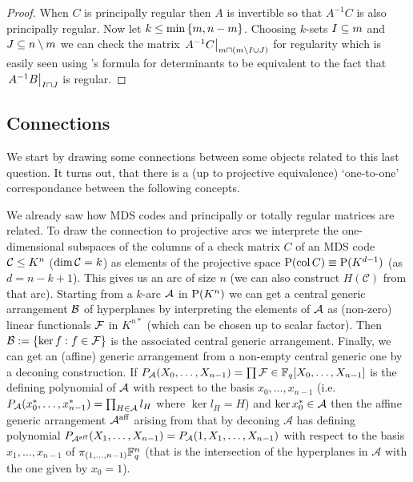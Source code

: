 \begin{proof}
    When $C$ is principally regular then $A$ is invertible so that $A^{-1}C$ is also principally regular. Now let $k\leq \min\left\{m,n-m\right\}$. Choosing $k$-sets $I\subseteq m$ and $J\subseteq n\setminus m$ we can check the matrix $\rest{A^{-1}C}_{m\settimes (m\setminus I\setjoin J)}$ for regularity which is easily seen using 's formula for determinants to be equivalent to the fact that $\rest{A^{-1}B}_{I\settimes J}$ is regular.
\end{proof}

\subsection{Connections}

We start by drawing some connections between some objects related to this last question.
It turns out, that there is a (up to projective equivalence) `one-to-one' correspondance between the following concepts.

We already saw how MDS codes and principally or totally regular matrices are related.
To draw the connection to projective arcs we interprete the one-dimensional subspaces of the columns of a check matrix $C$ of an MDS code $\mathcal{C}\leq K^n$ ($\dim\mathcal{C}=k$) as elements of the projective space $\proj(\col C)\iso \P(K^{d-1})$ (as $d=n-k+1$). This gives us an arc of size $n$ (we can also construct $H(\mathcal{C})$ from that arc).
Starting from a $k$-arc $\mathcal{A}$ in $\P(K^n)$ we can get a central generic arrangement $\mathcal{B}$ of hyperplanes by interpreting the elements of $\mathcal{A}$ as (non-zero) linear functionals $\mathcal{F}$ in $K^{n\ast}$ (which can be chosen up to scalar factor). Then $\mathcal{B}:=\left\{\ker f:f\in \mathcal{F}\right\}$ is the associated central generic arrangement.
Finally, we can get an (affine) generic arrangement from a non-empty central generic one by a deconing construction. If $P_{\mathcal{A}}(X_0,\ldots,X_{n-1})=\prod{\mathcal{F}}\in\mathbb{F}_{q}[X_0,\ldots,X_{n-1}]$ is the defining polynomial of $\mathcal{A}$ with respect to the basis $x_0,\ldots,x_{n-1}$ (i.e. $P_{\mathcal{A}}(x^{\ast}_0,\ldots,x^{\ast}_{n-1})=\prod_{H\in\mathcal{A}}{l_H}$ where $\ker l_H =H$) and $\ker x^{\ast}_0\in\mathcal{A}$ then the affine generic arrangement $\mathcal{A}^{\mathop\mathrm{aff}}$ arising from that by deconing $\mathcal{A}$ has defining polynomial $P_{\mathcal{A}^{\mathop\mathrm{aff}}}(X_1,\ldots,X_{n-1})=P_{\mathcal{A}}(1,X_1,\ldots,X_{n-1})$ with respect to the basis $x_1,\ldots,x_{n-1}$ of $\pi_{(1,\ldots,n-1)}\mathbb{F}_{q}^n$ (that is the intersection of the hyperplanes in $\mathcal{A}$ with the one given by $x_0=1$).

